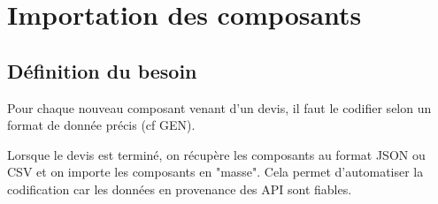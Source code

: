
\chapter{Importation des composants}

\section{Définition du besoin}

Pour chaque nouveau composant venant d'un devis, il faut le codifier selon un format de donnée précis (cf GEN).

Lorsque le devis est terminé, on récupère les composants au format JSON ou CSV et on importe les composants en "masse". Cela permet d'automatiser la codification car les données en provenance des API sont fiables.